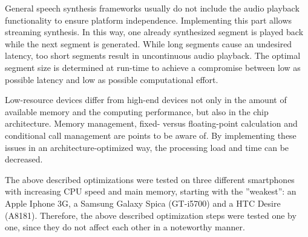 \begin{table}[h]
	\caption{Test settings of optimization approach B)~\cite{toth:optimizing}}
	\vspace{-0.75em}
	\label{tab:settings}
	\vspace{-0.5em}
\end{table}

General speech synthesis frameworks usually do not include the audio playback functionality to ensure platform independence. Implementing this part allows streaming synthesis. In this way, one already synthesized segment is played back while the next segment is generated. While long segments cause an undesired latency, too short segments result in uncontinuous audio playback. The optimal segment size is determined at run-time to achieve a compromise between low as possible latency and low as possible \break computational effort.

Low-resource devices differ from high-end devices not only in the amount of available memory and the computing performance, but also in the chip architecture. Memory management, fixed- versus floating-point calculation and conditional call management are points to be aware of. By implementing these issues in an architecture-optimized way, the processing load and time can be decreased.

The above described optimizations were tested on three different smartphones with increasing CPU speed and main memory, starting with the ''weakest'': an Apple Iphone 3G, a Samsung Galaxy Spica (GT-i5700) and a HTC Desire (A8181). Therefore, the above described optimization steps were tested one by one, since they do not affect each other in a noteworthy manner.

